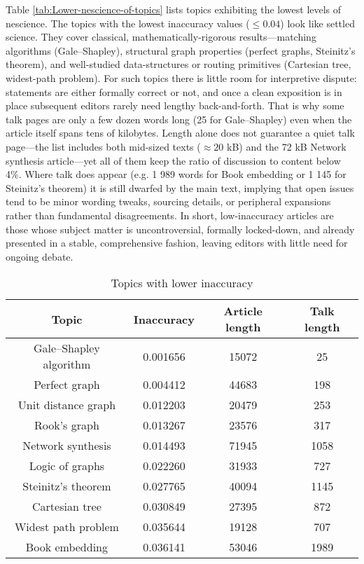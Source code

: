 Table \ref{tab:Lower-nescience-of-topics} lists topics exhibiting the lowest levels of nescience. The topics with the lowest inaccuracy values ($\leq 0.04$) look like settled science. They cover classical, mathematically-rigorous results—matching algorithms (Gale–Shapley), structural graph properties (perfect graphs, Steinitz’s theorem), and well-studied data-structures or routing primitives (Cartesian tree, widest-path problem). For such topics there is little room for interpretive dispute: statements are either formally correct or not, and once a clean exposition is in place subsequent editors rarely need lengthy back-and-forth. That is why some talk pages are only a few dozen words long (25 for Gale–Shapley) even when the article itself spans tens of kilobytes. Length alone does not guarantee a quiet talk page—the list includes both mid-sized texts ($\approx 20$ kB) and the 72 kB Network synthesis article—yet all of them keep the ratio of discussion to content below 4\%. Where talk does appear (e.g. 1 989 words for Book embedding or 1 145 for Steinitz’s theorem) it is still dwarfed by the main text, implying that open issues tend to be minor wording tweaks, sourcing details, or peripheral expansions rather than fundamental disagreements. In short, low-inaccuracy articles are those whose subject matter is uncontroversial, formally locked-down, and already presented in a stable, comprehensive fashion, leaving editors with little need for ongoing debate.

\begin{table}
\begin{centering}
\begin{tabular}{|c|c|c|c|}
\hline 
Topic & Inaccuracy & Article length & Talk length \tabularnewline
\hline 
\hline
Gale–Shapley algorithm & 0.001656 & 15072 & 25 \tabularnewline
\hline
Perfect graph & 0.004412 & 44683 & 198 \tabularnewline
\hline
Unit distance graph & 0.012203 & 20479 & 253 \tabularnewline
\hline
Rook's graph & 0.013267 & 23576 & 317 \tabularnewline
\hline
Network synthesis & 0.014493 & 71945 & 1058 \tabularnewline
\hline
Logic of graphs & 0.022260 & 31933 & 727 \tabularnewline
\hline
Steinitz's theorem & 0.027765 & 40094 & 1145 \tabularnewline
\hline
Cartesian tree & 0.030849 & 27395 & 872 \tabularnewline
\hline
Widest path problem & 0.035644 & 19128 & 707 \tabularnewline
\hline
Book embedding & 0.036141 & 53046 & 1989 \tabularnewline
\hline
\end{tabular}
\par\end{centering}
\caption{\label{tab:Lower-inaccuracy-of-topics}Topics with lower inaccuracy}
\end{table}

